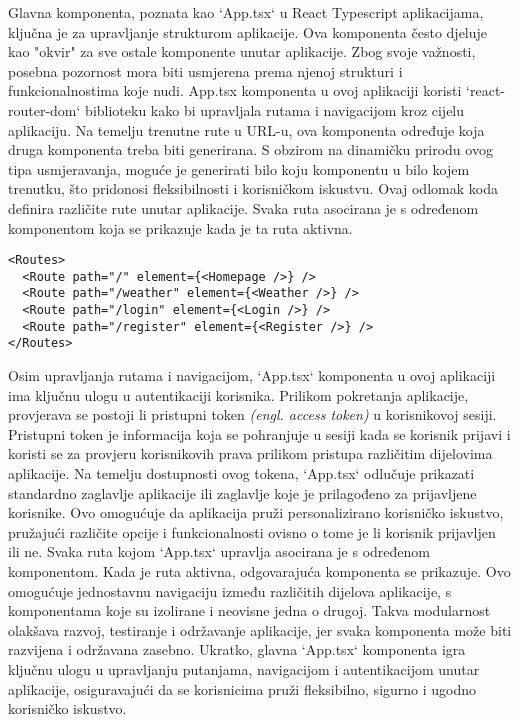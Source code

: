 \documentclass[times, utf8, zavrsni]{fer}
\begin{document}
Glavna komponenta, poznata kao `App.tsx` u React Typescript aplikacijama, ključna je za upravljanje strukturom aplikacije. Ova komponenta često djeluje kao "okvir" za sve ostale komponente unutar aplikacije. Zbog svoje važnosti, posebna pozornost mora biti usmjerena prema njenoj strukturi i funkcionalnostima koje nudi. App.tsx komponenta u ovoj aplikaciji koristi `react-router-dom` \cite{reactrouter} biblioteku kako bi upravljala rutama i navigacijom kroz cijelu aplikaciju. Na temelju trenutne rute u URL-u, ova komponenta određuje koja druga komponenta treba biti generirana. S obzirom na dinamičku prirodu ovog tipa usmjeravanja, moguće je generirati bilo koju komponentu u bilo kojem trenutku, što pridonosi fleksibilnosti i korisničkom iskustvu. Ovaj odlomak koda definira različite rute unutar aplikacije. Svaka ruta asocirana je s određenom komponentom koja se prikazuje kada je ta ruta aktivna.
\begin{verbatim}
<Routes>
  <Route path="/" element={<Homepage />} /> 
  <Route path="/weather" element={<Weather />} /> 
  <Route path="/login" element={<Login />} /> 
  <Route path="/register" element={<Register />} /> 
</Routes>

\end{verbatim}
Osim upravljanja rutama i navigacijom, `App.tsx` komponenta u ovoj aplikaciji ima ključnu ulogu u autentikaciji korisnika. Prilikom pokretanja aplikacije, provjerava se postoji li pristupni token \textit{(engl. access token)} u korisnikovoj sesiji. Pristupni token je informacija koja se pohranjuje u sesiji kada se korisnik prijavi i koristi se za provjeru korisnikovih prava prilikom pristupa različitim dijelovima aplikacije. Na temelju dostupnosti ovog tokena, `App.tsx` odlučuje prikazati standardno zaglavlje aplikacije ili zaglavlje koje je prilagođeno za prijavljene korisnike. Ovo omogućuje da aplikacija pruži personalizirano korisničko iskustvo, pružajući različite opcije i funkcionalnosti ovisno o tome je li korisnik prijavljen ili ne. Svaka ruta kojom `App.tsx` upravlja asocirana je s određenom komponentom. Kada je ruta aktivna, odgovarajuća komponenta se prikazuje. Ovo omogućuje jednostavnu navigaciju između različitih dijelova aplikacije, s komponentama koje su izolirane i neovisne jedna o drugoj. Takva modularnost olakšava razvoj, testiranje i održavanje aplikacije, jer svaka komponenta može biti razvijena i održavana zasebno. Ukratko, glavna `App.tsx` komponenta igra ključnu ulogu u upravljanju putanjama, navigacijom i autentikacijom unutar aplikacije, osiguravajući da se korisnicima pruži fleksibilno, sigurno i ugodno korisničko iskustvo.
\end{document}
